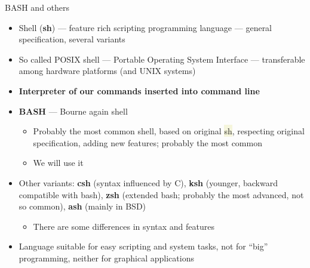 \documentclass[compress, xelatex, 11pt, xcolor=svgnames, aspectratio=169,
	hyperref={
		bookmarks=true,
		unicode=true,
		colorlinks=true,
		pdftitle={Linux, command line and MetaCentrum},
		plainpages=false,
		pdfauthor={Vojtech Zeisek},
		pdfsubject={Course about use of Linux command line, writing shell scripts and using MetaCentrum of CESNET},
		pdfcreator={XeLaTeX},
		pdfkeywords={Linux, GNU, BASH, shell, command line, MetaCentrum},
		linkcolor=DarkRed, %
		anchorcolor=DarkBlue, %
		citecolor=Indigo, %
		filecolor=NavyBlue, %
		menucolor=DarkMagenta, %
		urlcolor=DarkBlue, %
		},
	url={hyphens, lowtilde} %
	]{beamer}
\renewcommand{\texttt}[1]{\colorbox{Beige}{{\ttfamily #1}}}
\begin{document}
\begin{frame}{BASH and others}
	\begin{itemize}
		\item Shell (\textbf{sh}) --- feature rich scripting programming language --- general specification, several variants
		\item So called POSIX shell --- Portable Operating System Interface --- transferable among hardware platforms (and UNIX systems)
		\item \textbf{Interpreter of our commands inserted into command line}
		\item \textbf{BASH} --- Bourne again shell
		\begin{itemize}
			\item Probably the most common shell, based on original \texttt{sh}, respecting original specification, adding new features; probably the most common
			\item We will use it
		\end{itemize}
		\item Other variants: \textbf{csh} (syntax influenced by C), \textbf{ksh} (younger, backward compatible with bash), \textbf{zsh} (extended bash; probably the most advanced, not so common), \textbf{ash} (mainly in BSD)
		\begin{itemize}
		 \item There are some differences in syntax and features
		\end{itemize}
		\item Language suitable for easy scripting and system tasks, not for \enquote{big} programming, neither for graphical applications
	\end{itemize}
\end{frame}
\end{document}
